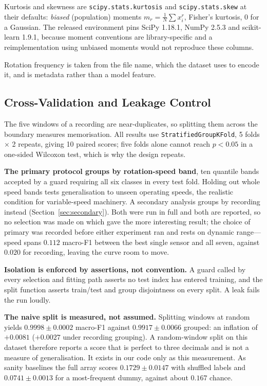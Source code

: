 \documentclass[conference]{IEEEtran}
\begin{document}
Kurtosis and skewness are \texttt{scipy.stats.kurtosis} and
\texttt{scipy.stats.skew} at their defaults: \emph{biased} (population)
moments $m_r=\frac{1}{N}\sum x_i^r$, Fisher's kurtosis, 0 for a Gaussian. The
released environment pins SciPy 1.18.1, NumPy 2.5.3 and scikit-learn
1.9.1, because moment conventions are library-specific and a
reimplementation using unbiased moments would not reproduce these columns.

Rotation frequency is taken from the file name, which the dataset uses to
encode it, and is metadata rather than a model feature.

\subsection{Cross-Validation and Leakage Control}
\label{sec:leakage}

The five windows of a recording are near-duplicates, so splitting them across
the boundary measures memorisation. All results use
\texttt{StratifiedGroupKFold}, 5 folds $\times$ 2 repeats, giving 10 paired
scores; five folds alone cannot reach $p<0.05$ in a one-sided Wilcoxon test,
which is why the design repeats.

\textbf{The primary protocol groups by rotation-speed band}, ten quantile bands
accepted by a guard requiring all six classes in every test fold. Holding out
whole speed bands tests generalisation to unseen operating speeds, the
realistic condition for variable-speed machinery. A secondary analysis groups
by recording instead (Section~\ref{sec:secondary}). Both were run in full and
both are reported, so no selection was made on which gave the more interesting
result; the choice of primary was recorded before either experiment ran and
rests on dynamic range---speed spans $0.112$ macro-F1 between the best single
sensor and all seven, against $0.020$ for recording, leaving the curve room to
move.

\textbf{Isolation is enforced by assertions, not convention.} A guard called by
every selection and fitting path asserts no test index has entered training,
and the split function asserts train/test and group disjointness on every
split. A leak fails the run loudly.

\textbf{The naive split is measured, not assumed.} Splitting windows at random
yields $0.9998 \pm 0.0002$ macro-F1 against $0.9917 \pm 0.0066$ grouped: an
inflation of $+0.0081$ ($+0.0027$ under recording grouping). A random-window
split on this dataset therefore reports a score that is perfect to three
decimals and is not a measure of generalisation. It exists in our code only as
this measurement. As sanity baselines the full array scores
$0.1729 \pm 0.0147$ with shuffled labels and $0.0741 \pm 0.0013$ for a
most-frequent dummy, against about $0.167$ chance.
\end{document}
